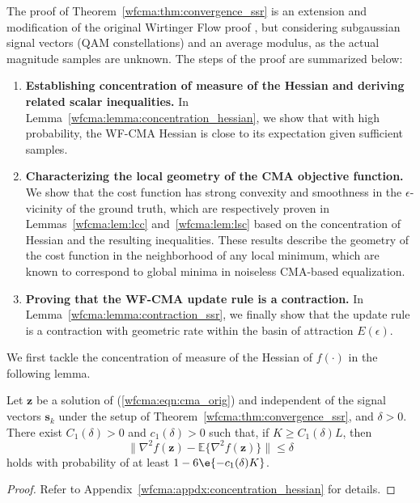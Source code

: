The proof of Theorem~\ref{wfcma:thm:convergence_ssr} is an extension and modification of the original Wirtinger Flow proof \cite{Candes2015a_phaseretrievalWF}, but considering subgaussian signal vectors (QAM constellations) and an average modulus, as the actual magnitude samples are unknown. The steps of the proof are summarized below: %
\begin{enumerate}
\item {\bf Establishing concentration of measure of the Hessian and deriving related scalar inequalities.} In Lemma~\ref{wfcma:lemma:concentration_hessian}, we show that with high probability, the WF-CMA Hessian is close to its expectation given sufficient samples. %
\item {\bf Characterizing the local geometry of the CMA objective function.} We show that the cost function has strong convexity and smoothness in the $\epsilon$-vicinity of the ground truth, which are respectively proven in Lemmas~\ref{wfcma:lem:lcc} and~\ref{wfcma:lem:lsc} 
based on the concentration of Hessian and the resulting inequalities. These results describe the geometry of the cost function in the neighborhood of any local minimum, which are known to correspond to global minima in noiseless CMA-based equalization. 
\item {\bf Proving that the WF-CMA update rule is a contraction.} In Lemma~\ref{wfcma:lemma:contraction_ssr}, we finally show that the update rule is a contraction with geometric rate within the basin of attraction $E(\epsilon)$. 
\end{enumerate}

We first tackle the concentration of measure of the Hessian of $f(\cdot)$ in the following lemma.
\begin{lem} \label{wfcma:lemma:concentration_hessian} 
Let $\bm{z}$ be a solution of (\ref{wfcma:eqn:cma_orig}) and independent of the signal vectors $\bm{s}_k$ under the setup of Theorem~\ref{wfcma:thm:convergence_ssr}, and $\delta>0$. There exist $C_1(\delta)>0$ and $c_1(\delta)>0$ such that, if $K\geq C_1(\delta) L$, then
\begin{equation}
	\big\|\nabla^2 f(\bm{z}) - \mathbb{E}\{\nabla^2 f(\bm{z})\}\big\| \leq \delta \label{wfcma:eqn:concentration_hessian}
\end{equation}
holds with probability of at least $1 -6\e{-c_1(\delta)K}$.
\end{lem}
\begin{proof}
Refer to Appendix~\ref{wfcma:appdx:concentration_hessian} for details.
\end{proof} 

